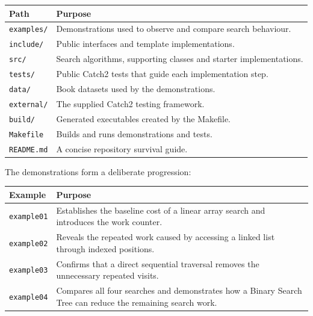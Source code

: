 \documentclass{csc2059practical}
\begin{document}
\begin{center}
\begin{tabular}{p{} p{}}
\toprule
\textbf{Path} & \textbf{Purpose} \\
\midrule
\texttt{examples/} & Demonstrations used to observe and compare search
                      behaviour. \\
\texttt{include/} & Public interfaces and template implementations. \\
\texttt{src/} & Search algorithms, supporting classes and starter
                  implementations. \\
\texttt{tests/} & Public Catch2 tests that guide each implementation step. \\
\texttt{data/} & Book datasets used by the demonstrations. \\
\texttt{external/} & The supplied Catch2 testing framework. \\
\texttt{build/} & Generated executables created by the Makefile. \\
\texttt{Makefile} & Builds and runs demonstrations and tests. \\
\texttt{README.md} & A concise repository survival guide. \\
\bottomrule
\end{tabular}
\end{center}

The demonstrations form a deliberate progression:

\begin{center}
\begin{tabular}{p{} p{}}
\toprule
\textbf{Example} & \textbf{Purpose} \\
\midrule
\texttt{example01}
&
Establishes the baseline cost of a linear array search and introduces the work
counter.
\\[1mm]

\texttt{example02}
&
Reveals the repeated work caused by accessing a linked list through indexed
positions.
\\[1mm]

\texttt{example03}
&
Confirms that a direct sequential traversal removes the unnecessary repeated
visits.
\\[1mm]

\texttt{example04}
&
Compares all four searches and demonstrates how a Binary Search Tree can reduce
the remaining search work.
\\
\bottomrule
\end{tabular}
\end{center}
\end{document}
